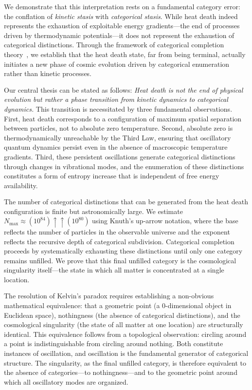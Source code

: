 \documentclass[12pt,a4paper]{article}
\theoremstyle{definition}
\theoremstyle{remark}
\newcommand{\Nmax}{N_{\text{max}}}
\begin{document}
We demonstrate that this interpretation rests on a fundamental category error: the conflation of \emph{kinetic stasis} with \emph{categorical stasis}. While heat death indeed represents the exhaustion of exploitable energy gradients—the end of processes driven by thermodynamic potentials—it does not represent the exhaustion of categorical distinctions. Through the framework of categorical completion theory~\citep{sachikonye2024categorical}, we establish that the heat death state, far from being terminal, actually initiates a new phase of cosmic evolution driven by categorical enumeration rather than kinetic processes.

Our central thesis can be stated as follows: \emph{Heat death is not the end of physical evolution but rather a phase transition from kinetic dynamics to categorical dynamics.} This transition is necessitated by three fundamental observations. First, heat death corresponds to a configuration of maximum spatial separation between particles, not to absolute zero temperature. Second, absolute zero is thermodynamically unreachable by the Third Law, ensuring that oscillatory quantum dynamics persist even in the absence of macroscopic temperature gradients. Third, these persistent oscillations generate categorical distinctions through changes in vibrational modes, and the enumeration of these distinctions constitutes a form of entropy increase that is independent of free energy availability.

The number of categorical distinctions that can be generated from the heat death configuration is finite but astronomically large. We estimate $\Nmax \approx (10^{84}) \uparrow\uparrow (10^{80})$ using Knuth's up-arrow notation, where the base reflects the number of particles in the observable universe and the exponent reflects the recursive depth of categorical subdivision. Categorical completion proceeds by systematically exhausting these distinctions until only one category remains unfilled. We prove that this final unfilled category is the cosmological singularity itself—the state in which all matter is concentrated at a single location.

The resolution of Kelvin's paradox requires establishing a non-obvious mathematical equivalence: that a geometric point (a 0-dimensional object in Euclidean space), nothingness (the absence of categorical distinctions), and the cosmological singularity (the state of all matter at one location) are structurally identical. This equivalence follows from a topological observation: circling around a point is indistinguishable from circling around nothing. Both constitute instances of oscillation, and oscillation is the fundamental generator of categorical structure. The singularity, as the final unfilled category, is therefore equivalent to the absence of categories—to nothingness—and to the geometric point around which all oscillatory modes are organized.
\end{document}
